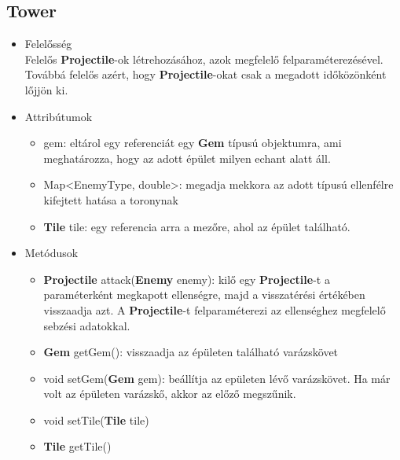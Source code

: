 \subsection{Tower}
\begin{itemize}
\item Felelősség\\
Felelős \textbf{Projectile}-ok létrehozásához, azok megfelelő felparaméterezésével. Továbbá felelős azért, hogy \textbf{Projectile}-okat csak a megadott időközönként lőjjön ki.
\item Attribútumok
	\begin{itemize}
		\item gem: eltárol egy referenciát egy \textbf{Gem} típusú objektumra, ami meghatározza, hogy az adott épület milyen echant alatt áll.
		\item Map<EnemyType, double>: megadja mekkora az adott típusú ellenfélre kifejtett hatása a toronynak
		\item \textbf{Tile} tile: egy referencia arra a mezőre, ahol az épület található.
	\end{itemize}
\item Metódusok
	\begin{itemize}
		\item \textbf{Projectile} attack(\textbf{Enemy} enemy): kilő egy \textbf{Projectile}-t a paraméterként megkapott ellenségre, majd a visszatérési értékében visszaadja azt. A \textbf{Projectile}-t felparaméterezi az ellenséghez megfelelő sebzési adatokkal.
		\item \textbf{Gem} getGem(): visszaadja az épületen található varázskövet
		\item void setGem(\textbf{Gem} gem): beállítja az epületen lévő varázskövet. Ha már volt az épületen varázskő, akkor az előző megszűnik.
		\item void setTile(\textbf{Tile} tile)
		\item \textbf{Tile} getTile()
	\end{itemize}
\end{itemize}

